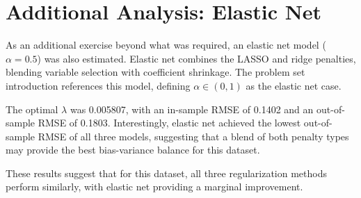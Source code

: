 \documentclass[12pt]{article}
\begin{document}
\section*{Additional Analysis: Elastic Net}

As an additional exercise beyond what was required, an elastic net model ($\alpha = 0.5$) was also estimated. Elastic net combines the LASSO and ridge penalties, blending variable selection with coefficient shrinkage. The problem set introduction references this model, defining $\alpha \in (0,1)$ as the elastic net case.

The optimal $\lambda$ was 0.005807, with an in-sample RMSE of 0.1402 and an out-of-sample RMSE of 0.1803. Interestingly, elastic net achieved the lowest out-of-sample RMSE of all three models, suggesting that a blend of both penalty types may provide the best bias-variance balance for this dataset.



These results suggest that for this dataset, all three regularization methods perform similarly, with elastic net providing a marginal improvement.
\end{document}

